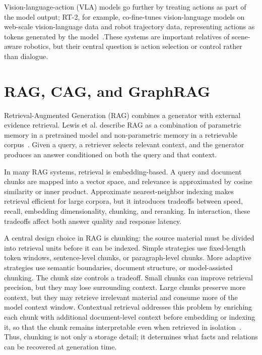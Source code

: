 Vision-lan\-guage-action (VLA) models go further by treating actions as part of the model output; RT-2, for example, co-fine-tunes vision-lan\-guage models on web-scale vision-lan\-guage data and robot trajectory data, representing actions as tokens generated by the model~\cite{brohan_rt-2_2023}.\@ These systems are important relatives of scene-aware robotics, but their central question is action selection or control rather than dialogue.

\section{RAG, CAG, and GraphRAG}\label{sec:rag-cag-graphrag}

Retrieval-Augmented Generation (RAG) combines a generator with external evidence retrieval. Lewis et al. describe RAG as a combination of parametric memory in a pretrained model and non-parametric memory in a retrievable corpus~\cite{lewis_retrieval-augmented_2020}. Given a query, a retriever selects relevant context, and the generator produces an answer conditioned on both the query and that context.

In many RAG systems, retrieval is embedding-based. A query and document chunks are mapped into a vector space, and relevance is approximated by cosine similarity or inner product. Approximate nearest-neighbor indexing makes retrieval efficient for large corpora, but it introduces tradeoffs between speed, recall, embedding dimensionality, chunking, and reranking. In interaction, these tradeoffs affect both answer quality and response latency.

A central design choice in RAG is chunking: the source material must be divided into retrieval units before it can be indexed. Simple strategies use fixed-length token windows, sentence-level chunks, or paragraph-level chunks. More adaptive strategies use semantic boundaries, document structure, or model-assisted chunking. The chunk size controls a tradeoff. Small chunks can improve retrieval precision, but they may lose surrounding context. Large chunks preserve more context, but they may retrieve irrelevant material and consume more of the model context window. Contextual retrieval addresses this problem by enriching each chunk with additional document-level context before embedding or indexing it, so that the chunk remains interpretable even when retrieved in isolation~\cite{noauthor_contextual_nodate}. Thus, chunking is not only a storage detail; it determines what facts and relations can be recovered at generation time.


